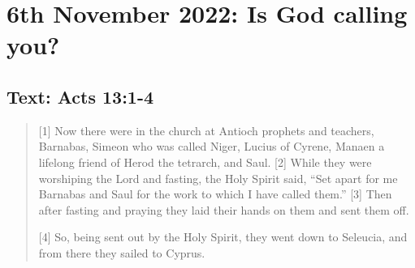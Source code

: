 \section{6th November 2022: Is God calling you?}
\subsection*{Text: Acts 13:1-4}
  \begin{quote}
    [1] Now there were in the church at Antioch prophets and teachers, Barnabas, Simeon who was called Niger, Lucius of Cyrene, Manaen a lifelong friend of Herod the tetrarch, and Saul. [2] While they were worshiping the Lord and fasting, the Holy Spirit said, “Set apart for me Barnabas and Saul for the work to which I have called them.” [3] Then after fasting and praying they laid their hands on them and sent them off.

    [4] So, being sent out by the Holy Spirit, they went down to Seleucia, and from there they sailed to Cyprus.
  \end{quote}
